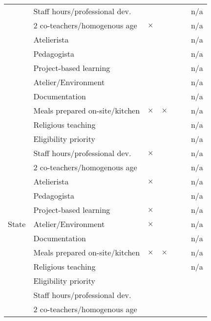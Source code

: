 \begin{tabular}{ c l |  c  c  c c c }
	&	Staff hours/professional dev.	&		&		&		&		&	n/a	\\
	\cmidrule{2-7}												
	&	2 co-teachers/homogenous age	&	$\times$	&		&		&		&	n/a	\\
	\cmidrule{2-7}												
	&	Atelierista	&		&		&		&		&	n/a	\\
	\cmidrule{2-7}												
	&	Pedagogista	&		&		&		&		&	n/a	\\
	\cmidrule{2-7}												
	&	Project-based learning	&		&		&		&		&	n/a	\\
	\cmidrule{2-7}												
	&	Atelier/Environment	&		&		&		&		&	n/a	\\
	\cmidrule{2-7}												
	&	Documentation	&		&		&		&		&	n/a	\\
	\cmidrule{2-7}												
	&	Meals prepared on-site/kitchen	&	$\times$	&	$\times$	&		&		&	n/a	\\
	\cmidrule{2-7}												
	&	Religious teaching	&		&		&		&		&	n/a	\\
	\midrule												
\multirow{19}{*}{State}	&	Eligibility priority	&	\checkmark	&		&		&		&	n/a	\\
	\cmidrule{2-7}												
	&	Staff hours/professional dev.	&	$\times$	&		&		&		&	n/a	\\
	\cmidrule{2-7}												
	&	2 co-teachers/homogenous age	&		&		&		&		&	n/a	\\
	\cmidrule{2-7}												
	&	Atelierista	&	$\times$	&		&		&		&	n/a	\\
	\cmidrule{2-7}												
	&	Pedagogista	&	\checkmark	&		&		&		&	n/a	\\
	\cmidrule{2-7}												
	&	Project-based learning	&	$\times$	&		&		&		&	n/a	\\
	\cmidrule{2-7}												
	&	Atelier/Environment	&	$\times$	&		&		&		&	n/a	\\
	\cmidrule{2-7}												
	&	Documentation	&	\checkmark	&		&		&		&	n/a	\\
	\cmidrule{2-7}												
	&	Meals prepared on-site/kitchen	&	$\times$	&	$\times$	&		&		&	n/a	\\
	\cmidrule{2-7}												
	&	Religious teaching	&		&		&		&		&	n/a	\\
	\midrule												
\multirow{19}{*}{Municipal-affiliated/Private}	&	Eligibility priority	&		&		&		&		&		\\
	\cmidrule{2-7}												
	&	Staff hours/professional dev.	&		&		&		&		&		\\
	\cmidrule{2-7}												
	&	2 co-teachers/homogenous age	&		&		&		&		&		\\

\end{tabular}
